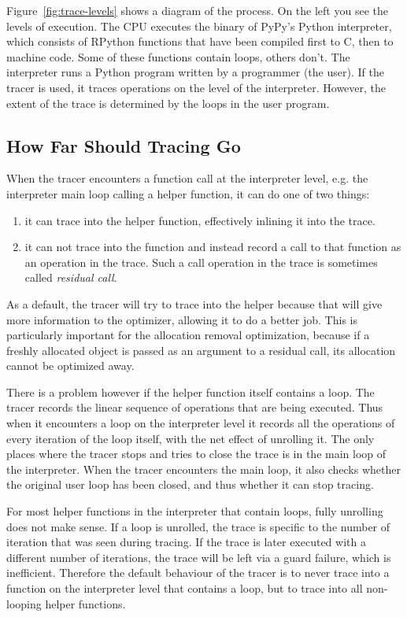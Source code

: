 \documentclass{sig-alternate}
\begin{document}
Figure~\ref{fig:trace-levels} shows a diagram of the process. On the left you
see the levels of execution. The CPU executes the binary of
PyPy's Python interpreter, which consists of RPython functions that have been
compiled first to C, then to machine code. Some of these functions contain
loops, others don't. The interpreter runs a Python program written by a
programmer (the user). If the tracer is used, it traces operations on the level
of the interpreter. However, the extent of the trace is determined by the loops
in the user program.


\subsection{How Far Should Tracing Go}

When the tracer encounters a function call at the interpreter level, e.g. the
interpreter main loop calling a helper function, it can do one of two things:

\begin{enumerate}
\item it can trace into the helper function, effectively inlining it into the trace.

\item it can not trace into the function and instead record a call to that function
as an operation in the trace. Such a call operation in the trace is sometimes
called \emph{residual call}.
\end{enumerate}

As a default, the tracer will try to trace into the helper because that will
give more information to the optimizer, allowing it to do a better job. This is
particularly important for the allocation removal optimization, because if a
freshly allocated object is passed as an argument to a residual call, its
allocation cannot be optimized away.

There is a problem however if the helper function itself contains a loop. The
tracer records the linear sequence of operations that are being executed. Thus
when it encounters a loop on the interpreter level it records all the
operations of every iteration of the loop itself, with the net effect of
unrolling it. The only places where the tracer stops and tries to close the
trace is in the main loop of the interpreter. When the tracer encounters the
main loop, it also checks whether the original user loop has been closed, and
thus whether it can stop tracing.

For most helper functions in the interpreter that contain loops, fully
unrolling does not make sense. If a loop is unrolled, the trace is specific to
the number of iteration that was seen during tracing. If the trace is later
executed with a different number of iterations, the trace will be left via a
guard failure, which is inefficient. Therefore the default behaviour of the
tracer is to never trace into a function on the interpreter level that contains
a loop, but to trace into all non-looping helper functions.
\end{document}
